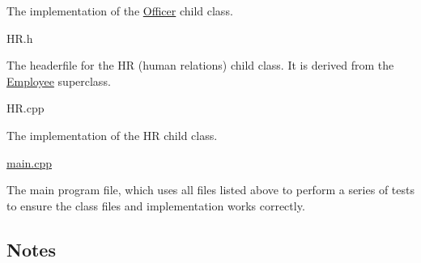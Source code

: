 \begin{DoxyItemize}
\begin{DoxyItemize}
\item The implementation of the \hyperlink{classOfficer}{Officer} child class.
\end{DoxyItemize}
\item H\+R.\+h
\begin{DoxyItemize}
\item The headerfile for the HR (human relations) child class. It is derived from the \hyperlink{classEmployee}{Employee} superclass.
\end{DoxyItemize}
\item H\+R.\+cpp
\begin{DoxyItemize}
\item The implementation of the HR child class.
\end{DoxyItemize}
\item \hyperlink{main_8cpp}{main.\+cpp}
\begin{DoxyItemize}
\item The main program file, which uses all files listed above to perform a series of tests to ensure the class files and implementation works correctly.
\end{DoxyItemize}
\end{DoxyItemize}

\subsection*{Notes}

